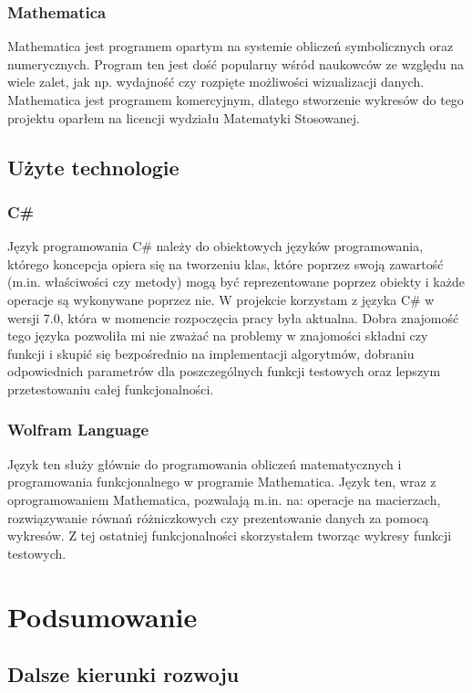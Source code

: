\documentclass[twoside]{projektInzynierskiMS1}
\newcommand{\si}{ś}
\begin{document}
	\subsubsection{Mathematica}
	Mathematica jest programem opartym na systemie obliczeń symbolicznych oraz numerycznych. Program ten jest do\si ć popularny w\si ród naukowców ze względu na wiele zalet, jak np. wydajno\si ć czy rozpięte możliwo\si ci wizualizacji danych. Mathematica jest programem komercyjnym, dlatego stworzenie wykresów do tego projektu oparłem na licencji wydziału Matematyki Stosowanej.
	
	\subsection{Użyte technologie}
	\subsubsection{C\#}
Język programowania C\# należy do obiektowych języków programowania, którego koncepcja opiera się na tworzeniu klas, które poprzez swoją zawarto\si ć (m.in. wła\si ciwo\si ci czy metody) mogą być reprezentowane poprzez obiekty i każde operacje są wykonywane poprzez nie. W projekcie korzystam z języka C\# w wersji 7.0, która w momencie rozpoczęcia pracy była aktualna. Dobra znajomo\si ć tego języka pozwoliła mi nie zważać na problemy w znajomo\si ci składni czy funkcji i skupić się bezpo\si rednio na implementacji algorytmów, dobraniu odpowiednich parametrów dla poszczególnych funkcji testowych oraz lepszym przetestowaniu całej funkcjonalno\si ci.

\subsubsection{Wolfram Language}
Język ten służy głównie do programowania obliczeń matematycznych i programowania funkcjonalnego w programie Mathematica. Język ten, wraz z oprogramowaniem Mathematica, pozwalają m.in. na: operacje na macierzach, rozwiązywanie równań różniczkowych czy prezentowanie danych za pomocą wykresów. Z tej ostatniej funkcjonalno\si ci skorzystałem tworząc wykresy funkcji testowych.

\section{Podsumowanie}
	\subsection{Dalsze kierunki rozwoju}
\end{document}
